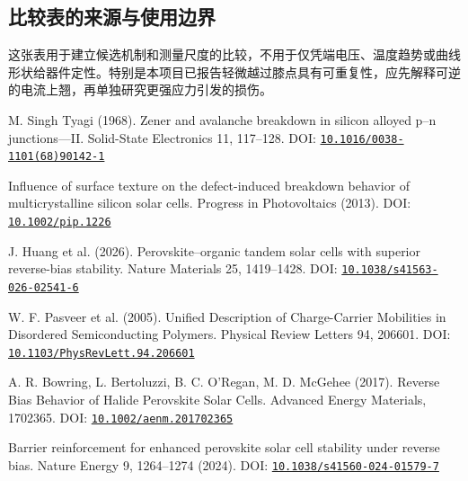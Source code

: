 \documentclass[11pt,a4paper]{article}
\begin{document}
\subsection*{{\cjkfont 比较表的来源与使用边界}\allowbreak{}}
{\cjkfont 这张表用于建立候选机制和测量尺度的比较，不用于仅凭端电压、温度趋势或曲线形状给器件定性。特别是本项目已报告轻微越过膝点具有可重复性，应先解释可逆的电流上翘，再单独研究更强应力引发的损伤。}\allowbreak{}\par\medskip
\noindent [C1] M. Singh Tyagi (1968). Zener and avalanche breakdown in silicon alloyed p–n junctions—II. Solid-State Electronics 11, 117–128. DOI: \href{https://doi.org/10.1016/0038-1101(68)90142-1}{\nolinkurl{10.1016/0038-1101(68)90142-1}}\par\smallskip
\noindent [C2] Influence of surface texture on the defect-induced breakdown behavior of multicrystalline silicon solar cells. Progress in Photovoltaics (2013). DOI: \href{https://doi.org/10.1002/pip.1226}{\nolinkurl{10.1002/pip.1226}}\par\smallskip
\noindent [C3] J. Huang et al. (2026). Perovskite–organic tandem solar cells with superior reverse-bias stability. Nature Materials 25, 1419–1428. DOI: \href{https://doi.org/10.1038/s41563-026-02541-6}{\nolinkurl{10.1038/s41563-026-02541-6}}\par\smallskip
\noindent [C4] W. F. Pasveer et al. (2005). Unified Description of Charge-Carrier Mobilities in Disordered Semiconducting Polymers. Physical Review Letters 94, 206601. DOI: \href{https://doi.org/10.1103/PhysRevLett.94.206601}{\nolinkurl{10.1103/PhysRevLett.94.206601}}\par\smallskip
\noindent [C5] A. R. Bowring, L. Bertoluzzi, B. C. O'Regan, M. D. McGehee (2017). Reverse Bias Behavior of Halide Perovskite Solar Cells. Advanced Energy Materials, 1702365. DOI: \href{https://doi.org/10.1002/aenm.201702365}{\nolinkurl{10.1002/aenm.201702365}}\par\smallskip
\noindent [C6] Barrier reinforcement for enhanced perovskite solar cell stability under reverse bias. Nature Energy 9, 1264–1274 (2024). DOI: \href{https://doi.org/10.1038/s41560-024-01579-7}{\nolinkurl{10.1038/s41560-024-01579-7}}\par\smallskip
{}\clearpage
\end{document}
